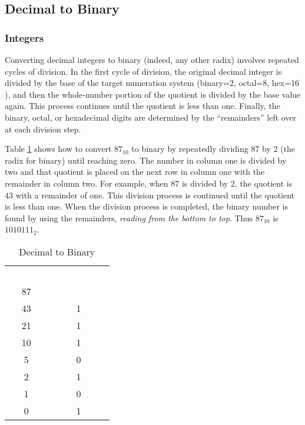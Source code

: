 \subsection{Decimal to Binary} 
\label{MF:sub:decimal_to_binary}
\subsubsection{Integers} 
\label{MF:subsub:decimal_to_binary_integers}

 Converting decimal integers to binary (indeed, any other radix) involves repeated cycles of division. In the first cycle of division, the original decimal integer is divided by the base of the target numeration system (binary=$ 2 $, octal=$ 8 $, hex=$ 16 $), and then the whole-number portion of the quotient is divided by the base value again. This process continues until the quotient is less than one. Finally, the binary, octal, or hexadecimal digits are determined by the ``remainders'' left over at each division step. 

Table \ref{MF:tab:dec_to_bin_integer} shows how to convert $ 87_{10} $ to binary by repeatedly dividing $ 87 $ by $ 2 $ (the radix for binary) until reaching zero. The number in column one is divided by two and that quotient is placed on the next row in column one with the remainder in column two. For example, when $ 87 $ is divided by $ 2 $, the quotient is $ 43 $ with a remainder of one. This division process is continued until the quotient is less than one. When the division process is completed, the binary number is found by using the remainders, \emph{reading from the bottom to top}. Thus $ 87_{10} $ is $ 1010111_2 $.

\begin{table}[H]
  \sffamily
  \newcommand{\head}[1]{\textcolor{white}{\textbf{#1}}}    
  \begin{center}
    \begin{tabular}{ c c } 
      \hline
      \rowcolor{black!75}
      \head{Integer} & \head{Remainder} \\
      87 &  \\
      43 & 1 \\
      21 & 1 \\
      10 & 1 \\
      5 & 0 \\
      2 & 1 \\
      1 & 0 \\
      0 & 1 \\ \hline
    \end{tabular}
  \end{center}
  \caption{Decimal to Binary}
  \label{MF:tab:dec_to_bin_integer}
\end{table}

